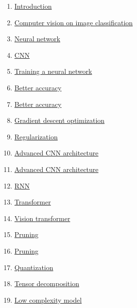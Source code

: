\documentclass[11pt]{article}
\begin{document}
\begin{multicols}{2}
	\begin{enumerate}
		\item \href{https://mp.weixin.qq.com/s/hTS3qJai7XrVJq7PlD-eDw}{Introduction}	%
		\item \href{https://mp.weixin.qq.com/s/-bzKYH3Y5CWONuKauAqjMg}{Computer vision on image classification}	%
		\item \href{https://mp.weixin.qq.com/s/hne7VGx6nsqVDk1Oe3vvIA}{Neural network}	%
		\item \href{https://mp.weixin.qq.com/s/vYB0BGCbQr9_aYRfHWUwmg}{CNN}	%
		\item \href{https://mp.weixin.qq.com/s/FymSC4bDlQWvpTCOpEKnSQ}{Training a neural network}	%
		\item \href{https://mp.weixin.qq.com/s/Oz4tO4YbwFigQSXB6oHpEA}{Better accuracy }	%
		\item \href{https://mp.weixin.qq.com/s/CzmBqYVYxnMsmKzN4rdcGw}{Better accuracy }	%
		\item \href{https://mp.weixin.qq.com/s/n4UTT8ziN334z7ZtlhS3ng}{Gradient descent optimization}	%
		\item \href{https://mp.weixin.qq.com/s/7zh9EIrVuvA3RfZBR0OV1Q}{Regularization}	%
		\item \href{https://mp.weixin.qq.com/s/MfsztpTSOg4RONw2_BE_HQ}{Advanced CNN architecture }	%
		\item \href{https://mp.weixin.qq.com/s/aAGuODKAunDyBY_njhwWnQ}{Advanced CNN architecture }	%
		\item \href{https://mp.weixin.qq.com/s/eLgKeoD7rFDQMFd5UtxSag}{RNN}	%
		\item \href{https://mp.weixin.qq.com/s/PIF-RMbm_ncMewI1iHP_RA}{Transformer}	%
		\item \href{https://mp.weixin.qq.com/s/Vsjn21My5FY9L7xTmv0B2g}{Vision transformer}	%
		\item \href{https://mp.weixin.qq.com/s/ZDmqugGn43vq0B1Bsprk_g}{Pruning }	%
		\item \href{https://mp.weixin.qq.com/s/zO7BQSgC4pLAhZ6swD0rWA}{Pruning }	%
		\item \href{https://mp.weixin.qq.com/s/IttMxJ4w6SoNQnebT10RsQ}{Quantization}	%
		\item \href{https://mp.weixin.qq.com/s/AcCNP5oUjgdPZ1qII65zKg}{Tensor decomposition}	%
		\item \href{https://mp.weixin.qq.com/s/2p_K0hLMI8C84s6qvcz79w}{Low complexity model }	%

\end{enumerate}
\end{multicols}
\end{document}
